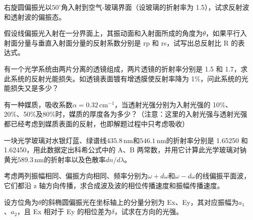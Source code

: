 \documentclass[padl, analysis, notocnum]{ExBook}
\newcommand{\answerarea}[1][3.5cm]{%
  \par\vspace{1mm}%
  \noindent{\color{themeColor!35}\rule{\linewidth}{0.4pt}}\par
  \noindent\begin{minipage}[t][#1][t]{\linewidth}\vspace{0pt}\end{minipage}\par
  \noindent{\color{themeColor!35}\rule{\linewidth}{0.4pt}}\par
}
\begin{document}
\begin{qitems}[startnum=4]
\qitem 右旋圆偏振光以$50^{\circ}$角入射到空气-玻璃界面（设玻璃的折射率为 1.5），试求反射波和透射波的偏振态。
\label{q:197:start}
\answerarea[7.0cm]
\label{q:197:end}
\end{qitems}

\begin{qitems}[startnum=5]
\qitem 假设线偏振光入射在一分界面上，其振动面和入射面所成的角度为$\theta$，如果平行入射面分量与垂直入射面分量的反射系数分别是 rp 和 rs，试写出总反射比 R 的表达式。
\label{q:198:start}
\answerarea[7.0cm]
\label{q:198:end}
\end{qitems}

\begin{qitems}[startnum=6]
\qitem 有一个光学系统由两片分离的透镜组成，两片透镜的折射率分别是 1.5 和 1.7，求此系统的反射光能损失。如透镜表面镀有增透膜使反射率降为 1\%，问此系统的光能损失又是多少？
\label{q:199:start}
\answerarea[7.0cm]
\label{q:199:end}
\end{qitems}

\begin{qitems}[startnum=7]
\qitem 有一种媒质，吸收系数$\alpha =0.32\,\mathrm{cm}^{-1}$，当透射光强分别为入射光强的 10\%、20\%、50\%及80\%时，媒质的厚度各为多少？（注意：这里的入射光强与透射光强都已经考虑到媒质表面的反射，也即解题过程中只考虑吸收）
\label{q:200:start}
\answerarea[7.0cm]
\label{q:200:end}
\end{qitems}

\begin{qitems}[startnum=8]
\qitem 一块光学玻璃对水银灯蓝、绿谱线$435.8\,\mathrm{nm}$和$546.1\,\mathrm{nm}$的折射率分别是 1.65250 和1.62450，用此数据定出科希公式中的 A、B 两常数，并用它计算此光学玻璃对钠黄光$589.3\,\mathrm{nm}$的折射率以及色散率$dn/d\lambda$。
\label{q:201:start}
\answerarea[7.0cm]
\label{q:201:end}
\end{qitems}

\begin{qitems}[startnum=9]
\qitem 考虑两列振幅相同、偏振方向相同、频率分别为$\omega +d\omega$和$\omega -d\omega$的线偏振平面波，它们都沿 z 轴方向传播，求合成波及波的相位传播速度和振幅传播速度。
\label{q:202:start}
\answerarea[7.0cm]
\label{q:202:end}
\end{qitems}

\begin{qitems}[startnum=10]
\qitem 设方位角为$\theta$的斜椭圆偏振光在坐标轴上的分量分别为 Ex、Ey，其对应振幅为$a_{1}$、$a_{2}$，且 Ex 相对于 Ey 的相位差为$\delta$，试求在方向的光强。
\label{q:203:start}
\answerarea[7.0cm]
\label{q:203:end}
\end{qitems}
\end{document}
